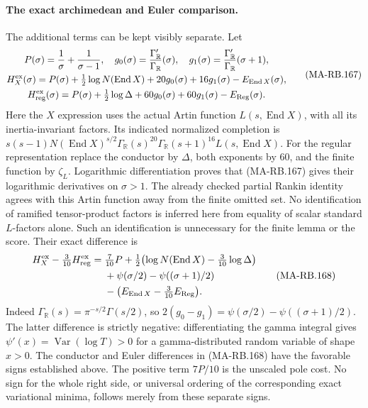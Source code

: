 \paragraph{The exact archimedean and Euler comparison.}
The additional terms can be kept visibly separate.
Let
\[
 \begin{gathered}
 P(\sigma)=\frac1\sigma+\frac1{\sigma-1},
 \quad
 g_0(\sigma)=\frac{\Gamma_{\mathbb R}'}{\Gamma_{\mathbb R}}
                                                   (\sigma),
 \quad
 g_1(\sigma)=\frac{\Gamma_{\mathbb R}'}{\Gamma_{\mathbb R}}
                                                   (\sigma+1),\\
 H_X^{\rm ex}(\sigma)
   =P(\sigma)+\tfrac12\log N(\operatorname{End}X)
                         +20g_0(\sigma)+16g_1(\sigma)
                         -E_{\operatorname{End}X}(\sigma),\\
 H_{\rm reg}^{\rm ex}(\sigma)
   =P(\sigma)+\tfrac12\log\Delta
                         +60g_0(\sigma)+60g_1(\sigma)
                         -E_{\operatorname{Reg}}(\sigma).
 \end{gathered}
 \tag{MA-RB.167}
\]
Here the \(X\) expression uses the actual Artin
function \(L(s,\operatorname{End}X)\), with all its
inertia-invariant factors.  Its indicated normalized
completion is
\(s(s-1)N(\operatorname{End}X)^{s/2}
\Gamma_{\mathbb R}(s)^{20}\Gamma_{\mathbb R}(s+1)^{16}
L(s,\operatorname{End}X)\).
For the regular representation replace the conductor
by \(\Delta\), both exponents by \(60\), and the finite
function by \(\zeta_L\).  Logarithmic differentiation
proves that (MA-RB.167) gives their logarithmic
derivatives on \(\sigma>1\).
The already checked partial Rankin identity agrees
with this Artin function away from the finite omitted
set.  No identification of ramified tensor-product
factors is inferred here from equality of scalar
standard \(L\)-factors alone.  Such an identification
is unnecessary for the finite lemma or the score.
Their exact difference is
\[
 \begin{split}
 H_X^{\rm ex}-\tfrac3{10}H_{\rm reg}^{\rm ex}
   ={}&\tfrac7{10}P
       +\tfrac12\bigl(\log N(\operatorname{End}X)
                                      -\tfrac3{10}\log\Delta\bigr)\\
     &+\psi(\sigma/2)-\psi((\sigma+1)/2)\\
     &-\bigl(E_{\operatorname{End}X}
                                  -\tfrac3{10}E_{\operatorname{Reg}}\bigr).
 \end{split}
 \tag{MA-RB.168}
\]
Indeed
\(\Gamma_{\mathbb R}(s)=\pi^{-s/2}\Gamma(s/2)\),
so \(2(g_0-g_1)=\psi(\sigma/2)-\psi((\sigma+1)/2)\).
The latter difference is strictly negative:
differentiating the gamma integral gives
\(\psi'(x)=\operatorname{Var}(\log T)>0\) for a
gamma-distributed random variable of shape \(x>0\).
The conductor and Euler differences in (MA-RB.168)
have the favorable signs established above.
The positive term \(7P/10\) is the unscaled pole cost.
No sign for the whole right side, or universal ordering
of the corresponding exact variational minima, follows
merely from these separate signs.

